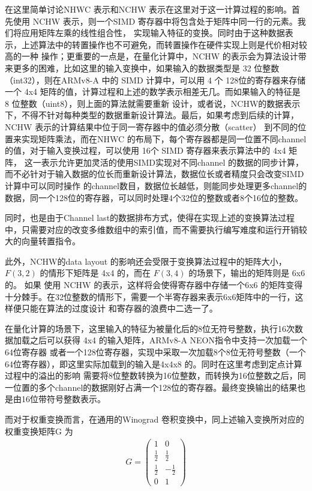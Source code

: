 在这里简单讨论NHWC 表示和NCHW 表示在这里对于这一计算过程的影响。首先使用 NCHW 表示，则一个SIMD 寄存器中将包含处于矩阵中同一行的元素。我们将应用矩阵左乘的线性组合性，
实现输入特征的变换。同时由于这种数据表示，上述算法中的转置操作也不可避免，而转置操作在硬件实现上则是代价相对较高的一种
操作；更重要的一点是，在量化计算中，NCHW 的表示会为算法设计带来更多的困难，比如这里的输入变换中，如果输入的数据类型是 32 位整数（int32），则在ARMv8-A 中的
SIMD 计算中，可以用 4 个 128位的寄存器来存储一个 4x4 矩阵的值，计算过程和上述的数学表示相差无几。而如果输入的特征是 8 位整数（uint8），则上面的算法就需要重新
设计，或者说，NCHW的数据表示下，不得不针对每种类型的数据重新设计算法。最后，如果考虑到后续的计算，NCHW 表示的计算结果中位于同一寄存器中的值必须分散（scatter）
到不同的位置来实现矩阵乘法，而在NHWC 的布局下，每个寄存器都是同一位置不同channel 的值，对于输入变换过程，可以使用  16个 SIMD 寄存器来表示算法中的 4x4 矩阵，
这一表示允许更加灵活的使用SIMD实现对不同channel 的数据的同步计算，而不必针对于输入数据的位长而重新设计算法，数据位长或者精度只会改变SIMD 计算中可以同时操作
的channel数目，数据位长越低，则能同步处理更多channel的数据，同一个128位的寄存器，可以同时处理4个32位的整数或者8个16位的整数。 

同时，也是由于Channel last的数据排布方式，使得在实现上述的变换算法过程中，只需要对应的改变多维数组中的索引值，而不需要执行编写难度和运行开销较大的向量转置指令。

此外，NCHW的data layout 的影响还会受限于变换算法过程中的矩阵大小，$F(3, 2)$ 的情形下矩阵是 4x4 的，而在 $F(3, 4)$ 的场景下，输出的矩阵则是 6x6 的。  如果
使用 NCHW 的表示，这样将会使得寄存器中存储一个6x6 的矩阵变得十分棘手。在32位整数的情形下，需要一个半寄存器来表示6x6矩阵中的一行，这样便只能在算法的过度设计
和寄存器的浪费中二选一了。

在量化计算的场景下，这里输入的特征为被量化后的8位无符号整数，执行16次数据加载之后可以获得 4x4 的输入矩阵，ARMv8-A NEON指令中支持一次加载一个64位寄存器
或者一个128位寄存器，实现中采取一次加载8个8位无符号整数（一个64位寄存器），即这里实际加载到的输入是4x4x8 的。同时在这里考虑到定点计算过程中的溢出的影响
需要将8位整数转换为16位整数，而转换为16位整数之后，同一位置的多个channel的数据刚好占满一个128位的寄存器。最终变换输出的结果也是由16位带符号整数表示。

而对于权重变换而言，在通用的Winograd 卷积变换中，同上述输入变换所对应的权重变换矩阵G 为 
\begin{align}
G = 
\begin{pmatrix}
  1 & 0 \\
  \frac{1}{2} & \frac{1}{2} \\
  \frac{1}{2} & -\frac{1}{2} \\
  0 & 1
\end{pmatrix}
\end{align}

